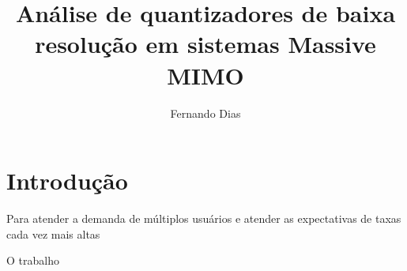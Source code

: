\documentclass{article}
\title{Análise de quantizadores de baixa resolução em sistemas Massive MIMO}
\author{Fernando Dias}
\date{}
\begin{document}
	\maketitle
	
	\section{Introdução}
    Para atender a demanda de múltiplos usuários e atender as expectativas de taxas cada vez mais altas
    
    O trabalho~\cite{@}
\end{document}

